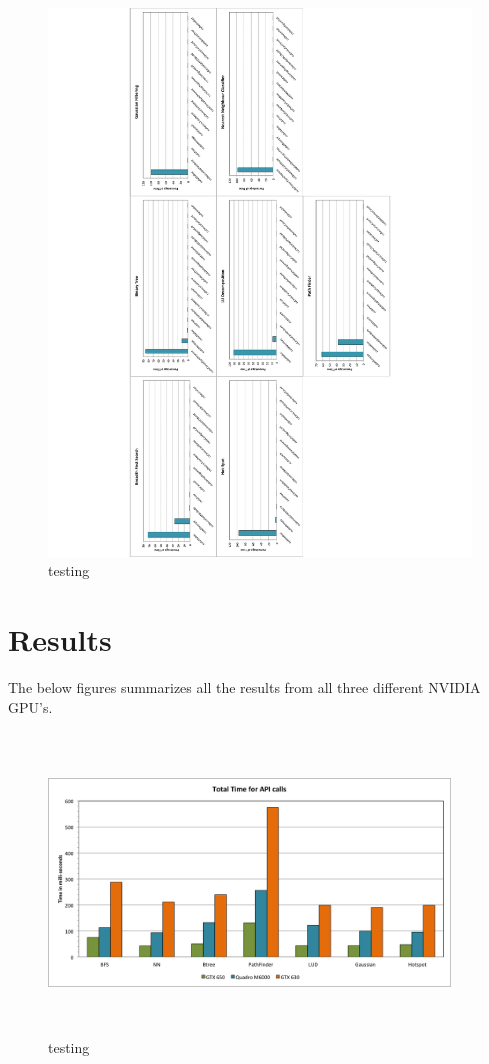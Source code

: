 \documentclass[paper=a4, fontsize=11pt]{scrartcl}
\numberwithin{equation}{section}		%
\numberwithin{figure}{section}			%
\numberwithin{table}{section}				%
\begin{document}
\begin{figure}[!h]
\centering
\includegraphics[scale=0.6]{../imgs/m6000.pdf}
\caption{testing}
\label{??}
\end{figure}






\newpage
\section{Results}

The below figures summarizes all the results from all three different NVIDIA GPU's. 


\begin{figure}[!h]
\centering
\includegraphics[width=0.95\textwidth,height=8cm]{../imgs/api_calls.png}
\caption{testing}
\label{??}
\end{figure}
\end{document}
